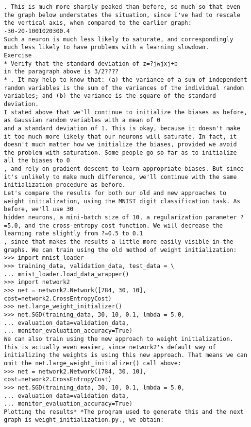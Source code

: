 \begin{lstlisting}
. This is much more sharply peaked than before, so much so that even the graph below understates the situation, since I've had to rescale the vertical axis, when compared to the earlier graph:
-30-20-1001020300.4 
Such a neuron is much less likely to saturate, and correspondingly much less likely to have problems with a learning slowdown.
Exercise
* Verify that the standard deviation of z=?jwjxj+b
in the paragraph above is 3/2????
* . It may help to know that: (a) the variance of a sum of independent random variables is the sum of the variances of the individual random variables; and (b) the variance is the square of the standard deviation. 
I stated above that we'll continue to initialize the biases as before, as Gaussian random variables with a mean of 0
and a standard deviation of 1. This is okay, because it doesn't make it too much more likely that our neurons will saturate. In fact, it doesn't much matter how we initialize the biases, provided we avoid the problem with saturation. Some people go so far as to initialize all the biases to 0
, and rely on gradient descent to learn appropriate biases. But since it's unlikely to make much difference, we'll continue with the same initialization procedure as before.
Let's compare the results for both our old and new approaches to weight initialization, using the MNIST digit classification task. As before, we'll use 30
hidden neurons, a mini-batch size of 10, a regularization parameter ?=5.0, and the cross-entropy cost function. We will decrease the learning rate slightly from ?=0.5 to 0.1
, since that makes the results a little more easily visible in the graphs. We can train using the old method of weight initialization: 
>>> import mnist_loader
>>> training_data, validation_data, test_data = \
... mnist_loader.load_data_wrapper()
>>> import network2
>>> net = network2.Network([784, 30, 10], cost=network2.CrossEntropyCost)
>>> net.large_weight_initializer()
>>> net.SGD(training_data, 30, 10, 0.1, lmbda = 5.0,
... evaluation_data=validation_data, 
... monitor_evaluation_accuracy=True)
We can also train using the new approach to weight initialization. This is actually even easier, since network2's default way of initializing the weights is using this new approach. That means we can omit the net.large_weight_initializer() call above: 
>>> net = network2.Network([784, 30, 10], cost=network2.CrossEntropyCost)
>>> net.SGD(training_data, 30, 10, 0.1, lmbda = 5.0,
... evaluation_data=validation_data, 
... monitor_evaluation_accuracy=True)
Plotting the results* *The program used to generate this and the next graph is weight_initialization.py., we obtain:


\end{lstlisting}
